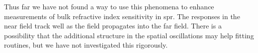 Thus far we have not found a way to use this phenomena to enhance
measurements of bulk refractive index sensitivity in \gls{spr}\@.  The responses in
the near field track well as the field propagates into the far field.
There is a possibility that the additional structure in the spatial
oscillations may help fitting routines, but we have not investigated this
rigorously.
